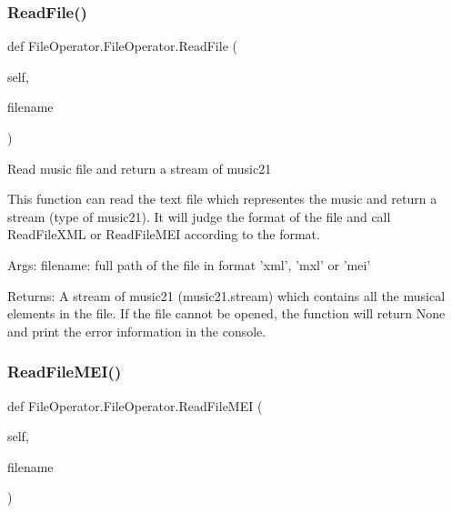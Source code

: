 \subsubsection{\texorpdfstring{Read\+File()}{ReadFile()}}
{\footnotesize\ttfamily def File\+Operator.\+File\+Operator.\+Read\+File (\begin{DoxyParamCaption}\item[{}]{self,  }\item[{}]{filename }\end{DoxyParamCaption})}

\begin{DoxyVerb}Read music file and return a stream of music21

This function can read the text file which representes the music and return
a stream (type of music21). It will judge the format of the file and call
ReadFileXML or ReadFileMEI according to the format.

Args:
    filename: full path of the file in format 'xml', 'mxl' or 'mei'

Returns:
    A stream of music21 (music21.stream) which contains all the musical
    elements in the file. If the file cannot be opened, the function will
    return None and print the error information in the console.
\end{DoxyVerb}
 \mbox{\label{class_file_operator_1_1_file_operator_aa89d861e179ddaea8d9e020e6b14d23e}} 
\subsubsection{\texorpdfstring{Read\+File\+M\+E\+I()}{ReadFileMEI()}}
{\footnotesize\ttfamily def File\+Operator.\+File\+Operator.\+Read\+File\+M\+EI (\begin{DoxyParamCaption}\item[{}]{self,  }\item[{}]{filename }\end{DoxyParamCaption})}

